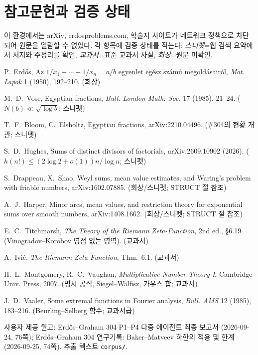 \section*{참고문헌과 검증 상태}
\noindent 이 환경에서는 arXiv, erdosproblems.com, 학술지 사이트가 네트워크 정책으로 차단되어 원문을 열람할 수 없었다. 각 항목에 검증 상태를 적는다: \emph{스니펫}=웹 검색 요약에서 서지와 주정리를 확인, \emph{교과서}=표준 교과서 사실, \emph{회상}=원문 미확인.
\begin{enumerate}[label={[\arabic*]}, leftmargin=2.2em, itemsep=2pt]
\item P.~Erdős, Az $1/x_1+\cdots+1/x_n=a/b$ egyenlet egész számú megoldásairól, \emph{Mat. Lapok} 1 (1950), 192--210. (회상)
\item M.~D.~Vose, Egyptian fractions, \emph{Bull. London Math. Soc.} 17 (1985), 21--24. ($N(b)\ll\sqrt{\log b}$; 스니펫)
\item T.~F.~Bloom, C.~Elsholtz, Egyptian fractions, arXiv:2210.04496. (\#304의 현황 개관; 스니펫)
\item S.~D.~Hughes, Sums of distinct divisors of factorials, arXiv:2609.10902 (2026). ($h(n!)\le(2\log2+o(1))n/\log n$; 스니펫)
\item S.~Drappeau, X.~Shao, Weyl sums, mean value estimates, and Waring's problem with friable numbers, arXiv:1602.07885. (회상/스니펫; STRUCT 절 참조)
\item A.~J.~Harper, Minor arcs, mean values, and restriction theory for exponential sums over smooth numbers, arXiv:1408.1662. (회상/스니펫; STRUCT 절 참조)
\item E.~C.~Titchmarsh, \emph{The Theory of the Riemann Zeta-Function}, 2nd ed., §6.19 (Vinogradov--Korobov 영점 없는 영역). (교과서)
\item A.~Ivić, \emph{The Riemann Zeta-Function}, Thm.~6.1. (교과서)
\item H.~L.~Montgomery, R.~C.~Vaughan, \emph{Multiplicative Number Theory I}, Cambridge Univ. Press, 2007. (명시 공식, Siegel--Walfisz, 가우스 합; 교과서)
\item J.~D.~Vaaler, Some extremal functions in Fourier analysis, \emph{Bull. AMS} 12 (1985), 183--216. (Beurling--Selberg 함수; 교과서급)
\item 사용자 제공 원고: Erdős--Graham 304 P1--P4 다중 에이전트 최종 보고서 (2026-09-24, 76쪽); Erdős--Graham 304 연구기록: Baker--Matveev 하한의 적용 및 한계 (2026-09-25, 74쪽). 추출 텍스트 \texttt{corpus/}.
\end{enumerate}
